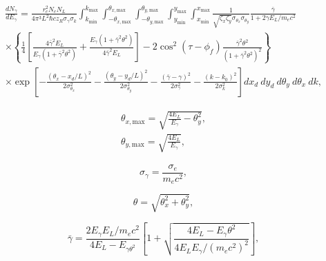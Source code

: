 \documentclass[../main.tex]{subfiles}
\begin{document}
\begin{multline}
\frac{dN_{\gamma}}{dE_{\gamma}} = \frac{r_{e}^{2}N_{e}N_{L}}{4\pi^{3}L^{2}\hbar c z_{R}\sigma_{\gamma}\sigma_{k}}\int_{k_{\mathrm{min}}}^{k_{\mathrm{max}}}\int_{-\theta_{x,\mathrm{max}}}^{\theta_{x,\mathrm{max}}}\int_{-\theta_{y,\mathrm{max}}}^{\theta_{y,\mathrm{max}}}\int_{y_{\mathrm{min}}}^{y_{\mathrm{max}}}\int_{x_{\mathrm{min}}}^{x_{\mathrm{max}}}\frac{1}{\sqrt{\zeta_{x}\zeta_{y}}\sigma_{\theta_{x}}\sigma_{\theta_{y}}}\frac{\bar{\gamma}}{1+2\gamma E_{L}/m_{e}c^{2}} \\
\times\left\{\frac{1}{4}\left[\frac{4\bar{\gamma}^{2}E_{L}}{E_{\gamma}\left(1+\bar{\gamma}^{2}\theta^{2}\right)}+\frac{E_{\gamma}\left(1+\bar{\gamma}^{2}\theta^{2}\right)}{4\bar{\gamma}^{2}E_{L}}\right]-2\cos^{2}\left(\tau-\phi_{f}\right)\frac{\bar{\gamma}^{2}\theta^{2}}{\left(1+\bar{\gamma}^{2}\theta^{2}\right)^{2}}\right\} \\
\times\exp{\left[-\frac{\left(\theta_{x}-x_{d}/L\right)^{2}}{2\sigma_{\theta_{x}}^{2}}-\frac{\left(\theta_{y}-y_{d}/L\right)^{2}}{2\sigma_{\theta_{y}}^{2}}-\frac{\left(\bar{\gamma}-\gamma\right)^{2}}{2\sigma_{\gamma}^{2}}-\frac{\left(k-k_{0}\right)^{2}}{2\sigma_{k}^{2}}\right]}dx_{d}~dy_{d}~d\theta_{y}~d\theta_{x}~dk,
\label{eq:ICARUS_equation}
\end{multline}







\begin{gather}
\theta_{x,\mathrm{max}} = \sqrt{\frac{4E_{L}}{E_{\gamma}}-\theta_{y}^{2}}, \\
\theta_{y,\mathrm{max}} = \sqrt{\frac{4E_{L}}{E_{\gamma}}},
\label{eq:theta_max_parameter_sun}
\end{gather}

\begin{equation}
\sigma_{\gamma} = \frac{\sigma_{e}}{m_{e}c^{2}},
\label{eq:gamma_energy_spread}
\end{equation}

\begin{equation}
\theta = \sqrt{\theta_{x}^{2}+\theta_{y}^{2}},
\label{eq:theta_angle_sun}
\end{equation}

\begin{equation}
\bar{\gamma} = \frac{2E_{\gamma}E_{L}/m_{e}c^{2}}{4E_{L}-E_{\gamma\theta^{2}}}\left[1+\sqrt{\frac{4E_{L}-E_{\gamma}\theta^{2}}{4E_{L}E_{\gamma}/\left(m_{e}c^{2}\right)^{2}}}\right],  
\label{eq:gamma_bar_sun}
\end{equation}
\end{document}
